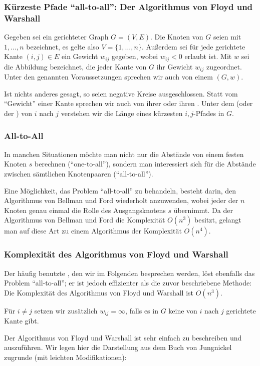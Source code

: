 \documentclass[smaller,xcolor=dvipsnames]{beamer}
\begin{document}
\begin{frame}
\frametitle{Kürzeste Pfade \enquote{all-to-all}: Der Algorithmus von Floyd und Warshall}
 Gegeben sei ein gerichteter Graph $G=(V,E)$. Die Knoten von $G$ seien mit $1,\ldots,n$ bezeichnet, es gelte also $V = \{ 1,\ldots,n \}$. Außerdem sei für jede gerichtete Kante $(i,j) \in E$ ein Gewicht $w_{ij}$ gegeben, wobei $w_{ij} < 0$ erlaubt ist. Mit $w$ sei die Abbildung bezeichnet, die jeder Kante von $G$ ihr Gewicht $w_{ij}$ zugeordnet. Unter den genannten Voraussetzungen sprechen wir auch von einem  $(G,w)$. \\ \medskip

Ist nichts anderes gesagt, so seien negative Kreise ausgeschlossen. Statt vom \enquote{Gewicht} einer Kante sprechen wir auch von ihrer  oder ihren . Unter dem  (oder der ) von $i$ nach $j$ verstehen wir die Länge eines kürzesten $i,j$-Pfades in $G$.
\end{frame}

\begin{frame}
\frametitle{All-to-All}
 In manchen Situationen möchte man nicht nur die Abstände von einem festen Knoten $s$ berechnen (\enquote{one-to-all}), sondern man interessiert sich für die \alert{Abstände zwischen sämtlichen Knotenpaaren} (\enquote{all-to-all}). \\ \medskip

Eine Möglichkeit, das Problem \enquote{all-to-all} zu behandeln, besteht darin, den Algorithmus von Bellman und Ford wiederholt anzuwenden, wobei jeder der $n$ Knoten genau einmal die Rolle des Ausgangsknotens $s$ übernimmt. Da der Algorithmus von Bellman und Ford  die Komplexität $O(n^3)$ besitzt, gelangt man auf diese Art zu einem Algorithmus der Komplexität \alert{$O(n^4)$.}
\end{frame}

\begin{frame}
\frametitle{Komplexität des Algorithmus von Floyd und Warshall}
Der häufig benutzte , den wir im Folgenden besprechen werden, löst ebenfalls das Problem \enquote{all-to-all}; er ist jedoch effizienter als die zuvor beschriebene Methode: \alert{Die Komplexität des Algorithmus von Floyd und Warshall ist $O(n^3)$.} \\ \medskip

Für $i \neq j$ setzen wir zusätzlich $w_{ij} = \infty$, falls es in $G$ keine von $i$ nach $j$ gerichtete Kante gibt. \\ \medskip

Der Algorithmus von Floyd und Warshall ist sehr einfach zu beschreiben und auszuführen. Wir legen hier die Darstellung aus dem Buch von Jungnickel zugrunde (mit leichten Modifikationen):
\end{frame}
\end{document}
